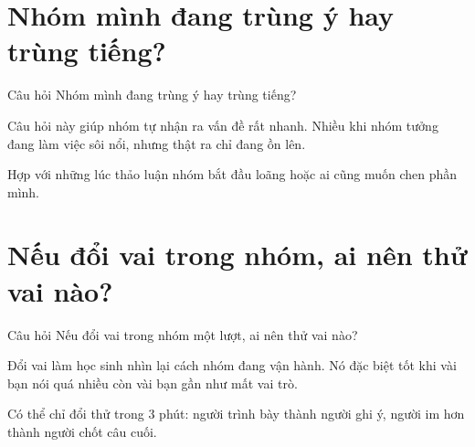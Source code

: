 \section{Nhóm mình đang trùng ý hay trùng tiếng?}
\begin{cauhoibox}{Câu hỏi}
Nhóm mình đang trùng ý hay trùng tiếng?
\end{cauhoibox}
\begin{taisaocoich}
Câu hỏi này giúp nhóm tự nhận ra vấn đề rất nhanh. Nhiều khi nhóm tưởng đang làm việc sôi nổi, nhưng thật ra chỉ đang ồn lên.
\end{taisaocoich}
\begin{goiybien}
Hợp với những lúc thảo luận nhóm bắt đầu loãng hoặc ai cũng muốn chen phần mình.
\end{goiybien}
\ngancach

\section{Nếu đổi vai trong nhóm, ai nên thử vai nào?}
\begin{cauhoibox}{Câu hỏi}
Nếu đổi vai trong nhóm một lượt, ai nên thử vai nào?
\end{cauhoibox}
\begin{taisaocoich}
Đổi vai làm học sinh nhìn lại cách nhóm đang vận hành. Nó đặc biệt tốt khi vài bạn nói quá nhiều còn vài bạn gần như mất vai trò.
\end{taisaocoich}
\begin{goiybien}
Có thể chỉ đổi thử trong 3 phút: người trình bày thành người ghi ý, người im hơn thành người chốt câu cuối.
\end{goiybien}
